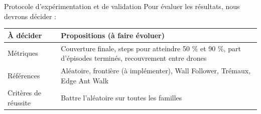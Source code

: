 \documentclass[aspectratio=169,11pt]{beamer}
\begin{document}
\begin{frame}{Protocole d'expérimentation et de validation}
  Pour évaluer les résultats, nous devrons décider :

  \vspace{0.6em}
  \centering
  \small
  \renewcommand{\arraystretch}{1.35}
  \begin{tabular}{p{2.9cm}p{9.8cm}}
    \toprule
    À décider & Propositions (à faire évoluer) \\
    \midrule
    Métriques & Couverture finale, steps pour atteindre 50 \% et 90 \%, part d'épisodes terminés, recouvrement entre drones \\
    Références & Aléatoire, frontière (à implémenter), Wall Follower, Trémaux, Edge Ant Walk \\
    Critères de réussite & Battre l'aléatoire sur toutes les familles\\
    \bottomrule
  \end{tabular}
\end{frame}
\end{document}
